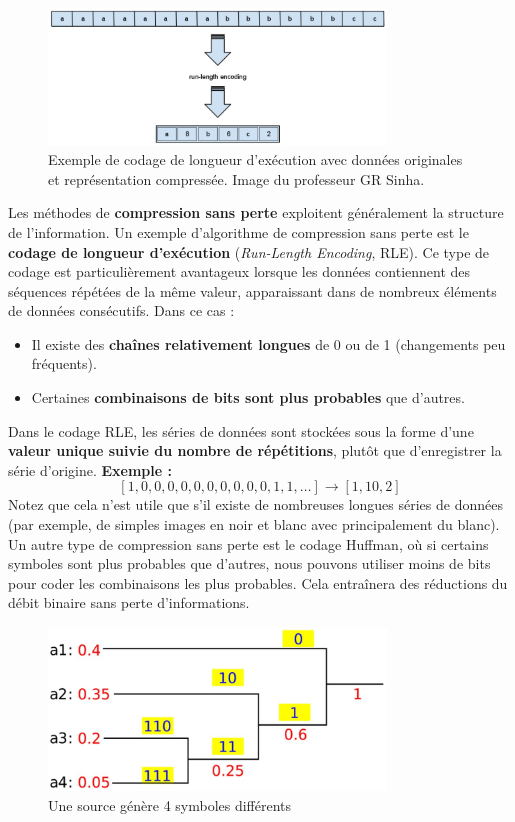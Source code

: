 \begin{figure}[H] %
    \centering
    \includegraphics[width=0.8\textwidth]{figures/6-23.jpg}
    \caption{Exemple de codage de longueur d'exécution avec données originales et représentation compressée. Image du professeur GR Sinha.}
    \label{fig:communication2}
\end{figure}
Les méthodes de \textbf{compression sans perte} exploitent généralement la structure de l'information.  
Un exemple d'algorithme de compression sans perte est le \textbf{codage de longueur d'exécution} (\textit{Run-Length Encoding}, RLE). Ce type de codage est particulièrement avantageux lorsque les données contiennent des séquences répétées de la même valeur, apparaissant dans de nombreux éléments de données consécutifs.  
Dans ce cas :
\begin{itemize}
    \item Il existe des \textbf{chaînes relativement longues} de 0 ou de 1 (changements peu fréquents).
    \item Certaines \textbf{combinaisons de bits sont plus probables} que d'autres.
\end{itemize}
Dans le codage RLE, les séries de données sont stockées sous la forme d'une \textbf{valeur unique suivie du nombre de répétitions}, plutôt que d'enregistrer la série d'origine.  
\medskip
\textbf{Exemple :}  
\[
[1,0,0,0,0,0,0,0,0,0,0,1,1,\dots] \rightarrow [1,10,2]
\]
Notez que cela n'est utile que s'il existe de nombreuses longues séries de données (par exemple, de simples images en noir et blanc avec principalement du blanc).
Un autre type de compression sans perte est le codage Huffman, où si certains symboles sont plus probables que d'autres, nous pouvons utiliser moins de bits pour coder les combinaisons les plus probables. Cela entraînera des réductions du débit binaire sans perte d'informations.
\begin{figure}[H] %
    \centering
    \includegraphics[width=0.8\textwidth]{figures/6-24.jpg}
    \caption{Une source génère 4 symboles différents}
    \label{fig:communication2}
\end{figure}
